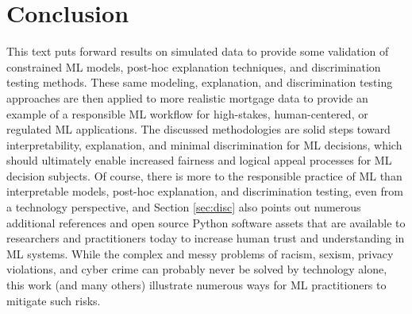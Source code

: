\documentclass[information,article,submit,moreauthors,pdftex]{definitions/mdpi}
\begin{document}
\section{Conclusion}\label{sec:con}

This text puts forward results on simulated data to provide some validation of constrained ML models, post-hoc explanation techniques, and discrimination testing methods. These same modeling, explanation, and discrimination testing approaches are then applied to more realistic mortgage data to provide an example of a responsible ML workflow for high-stakes, human-centered, or regulated ML applications. The discussed methodologies are solid steps toward interpretability, explanation, and minimal discrimination for ML decisions, which should ultimately enable increased fairness and logical appeal processes for ML decision subjects. Of course, there is more to the responsible practice of ML than interpretable models, post-hoc explanation, and discrimination testing, even from a technology perspective, and Section \ref{sec:disc} also points out numerous additional references and open source Python software assets that are available to researchers and practitioners today to increase human trust and understanding in ML systems. While the complex and messy problems of racism, sexism, privacy violations, and cyber crime can probably never be solved by technology alone, this work (and many others) illustrate numerous ways for ML practitioners to mitigate such risks. 


\end{document}
